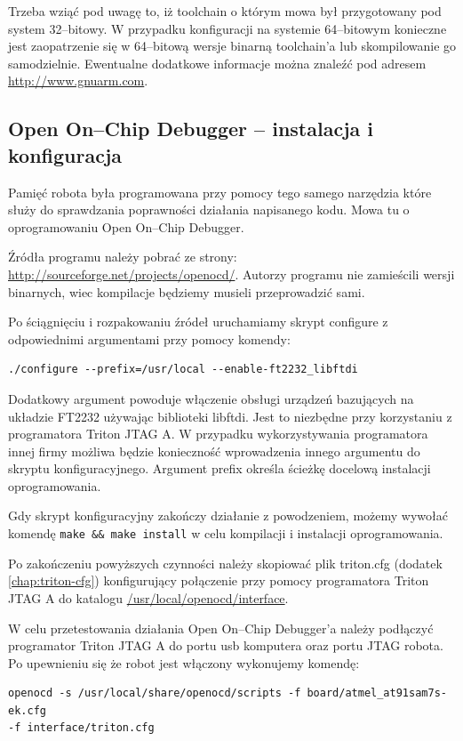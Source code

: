 Trzeba wziąć pod uwagę to, iż toolchain o którym mowa był przygotowany pod system
32--bitowy. W przypadku konfiguracji na systemie 64--bitowym konieczne jest
zaopatrzenie się w 64--bitową wersje binarną toolchain'a lub skompilowanie go
samodzielnie. Ewentualne dodatkowe informacje można znaleźć pod adresem
\url{http://www.gnuarm.com}.

\subsection{Open On--Chip Debugger -- instalacja i konfiguracja}
\label{roz:opendocd-install}
Pamięć robota była programowana przy pomocy tego samego narzędzia które służy do
sprawdzania poprawności działania napisanego kodu. Mowa tu o oprogramowaniu Open
On--Chip Debugger.

Źródła programu należy pobrać ze strony:
\url{http://sourceforge.net/projects/openocd/}. Autorzy programu nie zamieścili
wersji binarnych, wiec kompilacje będziemy musieli przeprowadzić sami.

Po ściągnięciu i rozpakowaniu źródeł uruchamiamy skrypt configure z odpowiednimi
argumentami przy pomocy komendy:

\begin{verbatim}
./configure --prefix=/usr/local --enable-ft2232_libftdi 
\end{verbatim}

Dodatkowy argument powoduje włączenie obsługi urządzeń bazujących na układzie
FT2232 używając biblioteki libftdi. Jest to niezbędne przy korzystaniu z
programatora Triton JTAG A. W przypadku wykorzystywania programatora innej firmy
możliwa będzie konieczność wprowadzenia innego argumentu do skryptu
konfiguracyjnego. Argument prefix określa ścieżkę docelową instalacji
oprogramowania.

Gdy skrypt konfiguracyjny zakończy działanie z powodzeniem, możemy wywołać
komendę \verb|make && make install| w celu kompilacji i instalacji
oprogramowania.

Po zakończeniu powyższych czynności należy skopiować plik triton.cfg (dodatek \ref{chap:triton-cfg}) konfigurujący
połączenie przy pomocy programatora Triton JTAG A do katalogu
\url{/usr/local/openocd/interface}.

W celu przetestowania działania Open On--Chip Debugger'a należy podłączyć
programator Triton JTAG A do portu usb komputera oraz portu JTAG robota. Po
upewnieniu się że robot jest włączony wykonujemy komendę:

\begin{verbatim}
openocd -s /usr/local/share/openocd/scripts -f board/atmel_at91sam7s-ek.cfg
-f interface/triton.cfg 
\end{verbatim}

